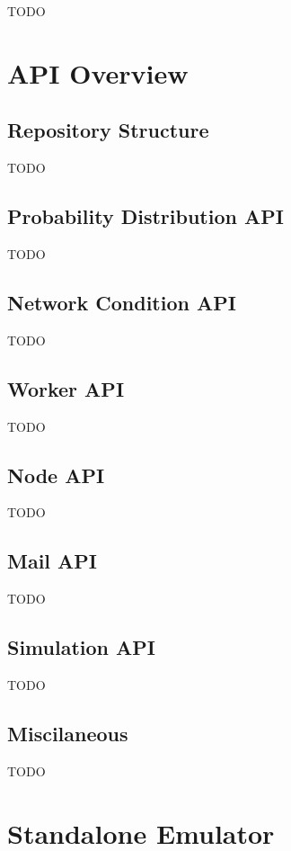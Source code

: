 TODO


\section{API Overview}

\subsection{Repository Structure}

TODO

\subsection{Probability Distribution API}

TODO

\subsection{Network Condition API}

TODO

\subsection{Worker API}

TODO

\subsection{Node API}

TODO

\subsection{Mail API}

TODO

\subsection{Simulation API}

TODO

\subsection{Miscilaneous}

TODO


\section{Standalone Emulator}

